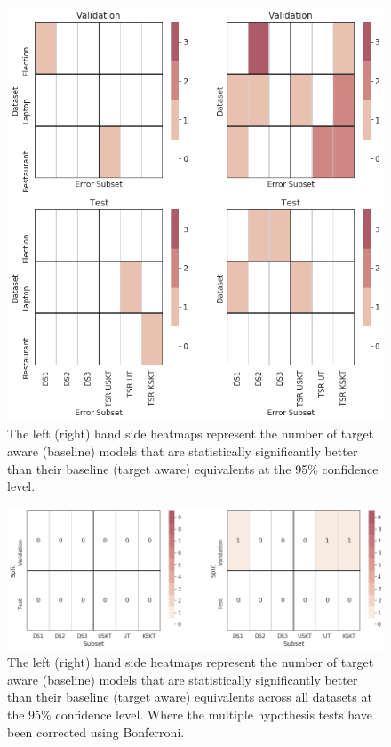 \begin{figure}[!h]
    \centering
    \includegraphics[scale=0.4]{images/augmentation/methods_performance/Inter_Target/inter_target_split_dataset_heatmaps.png}
    \caption{The left (right) hand side heatmaps represent the number of target aware (baseline) models that are statistically significantly better than their baseline (target aware) equivalents at the 95\% confidence level.}
    \label{fig:aug_inter_target_split_dataset_heatmaps}
\end{figure}
\begin{figure}[!h]
    \centering
    \includegraphics[scale=0.35]{images/augmentation/methods_performance/Inter_Target/inter_target_split_combined_heatmap.png}
    \caption{The left (right) hand side heatmaps represent the number of target aware (baseline) models that are statistically significantly better than their baseline (target aware) equivalents across all datasets at the 95\% confidence level. Where the multiple hypothesis tests have been corrected using Bonferroni.}
    \label{fig:aug_inter_target_split_combined_heatmap}
\end{figure}

